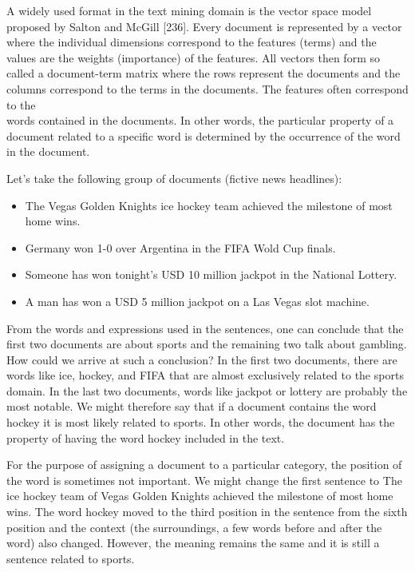 \documentclass[10pt]{book}
\begin{document}
A widely used format in the text mining domain is the vector space model proposed by Salton and McGill [236]. Every document is represented by a vector where the individual dimensions correspond to the features (terms) and the values are the weights (importance) of the features. All vectors then form so called a document-term matrix where the rows represent the documents and the columns correspond to the terms in the documents. The features often correspond to the\\
words contained in the documents. In other words, the particular property of a document related to a specific word is determined by the occurrence of the word in the document.

Let's take the following group of documents (fictive news headlines):

\begin{itemize}
  \item The Vegas Golden Knights ice hockey team achieved the milestone of most home wins.
  \item Germany won 1-0 over Argentina in the FIFA Wold Cup finals.
  \item Someone has won tonight's USD 10 million jackpot in the National Lottery.
  \item A man has won a USD 5 million jackpot on a Las Vegas slot machine.
\end{itemize}

From the words and expressions used in the sentences, one can conclude that the first two documents are about sports and the remaining two talk about gambling. How could we arrive at such a conclusion? In the first two documents, there are words like ice, hockey, and FIFA that are almost exclusively related to the sports domain. In the last two documents, words like jackpot or lottery are probably the most notable. We might therefore say that if a document contains the word hockey it is most likely related to sports. In other words, the document has the property of having the word hockey included in the text.

For the purpose of assigning a document to a particular category, the position of the word is sometimes not important. We might change the first sentence to The ice hockey team of Vegas Golden Knights achieved the milestone of most home wins. The word hockey moved to the third position in the sentence from the sixth position and the context (the surroundings, a few words before and after the word) also changed. However, the meaning remains the same and it is still a sentence related to sports.
\end{document}
